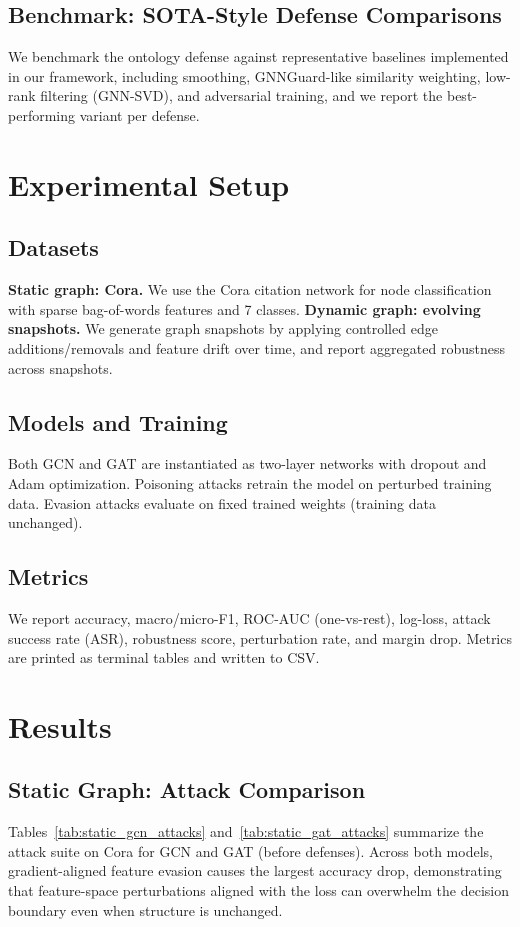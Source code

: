 \documentclass[conference]{IEEEtran}
\newcommand{\inputtable}[1]{%
  \IfFileExists{tables/#1}{}{}%
}
\begin{document}
\subsection{Benchmark: SOTA-Style Defense Comparisons}
We benchmark the ontology defense against representative baselines implemented in our framework, including smoothing, GNNGuard-like similarity weighting, low-rank filtering (GNN-SVD), and adversarial training, and we report the best-performing variant per defense.
\inputtable{defense_benchmark.tex}

\section{Experimental Setup}
\subsection{Datasets}
\textbf{Static graph: Cora.} We use the Cora citation network for node classification with sparse bag-of-words features and 7 classes.
\textbf{Dynamic graph: evolving snapshots.} We generate graph snapshots by applying controlled edge additions/removals and feature drift over time, and report aggregated robustness across snapshots.

\subsection{Models and Training}
Both GCN and GAT are instantiated as two-layer networks with dropout and Adam optimization. Poisoning attacks retrain the model on perturbed training data. Evasion attacks evaluate on fixed trained weights (training data unchanged).

\subsection{Metrics}
We report accuracy, macro/micro-F1, ROC-AUC (one-vs-rest), log-loss, attack success rate (ASR), robustness score, perturbation rate, and margin drop. Metrics are printed as terminal tables and written to CSV.

\section{Results}
\subsection{Static Graph: Attack Comparison}
Tables~\ref{tab:static_gcn_attacks} and~\ref{tab:static_gat_attacks} summarize the attack suite on Cora for GCN and GAT (before defenses). Across both models, gradient-aligned feature evasion causes the largest accuracy drop, demonstrating that feature-space perturbations aligned with the loss can overwhelm the decision boundary even when structure is unchanged.
\end{document}
